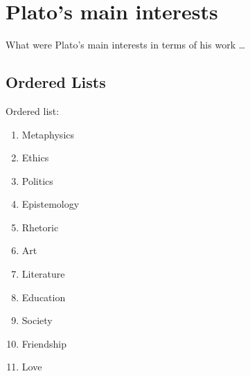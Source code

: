 \documentclass[11pt]{article}
\begin{document}
	\section{Plato's main interests} %
		What were Plato's main interests in terms of his work \ldots

		\subsection{Ordered Lists}

			Ordered list:

			\begin{enumerate}
    			\item Metaphysics
				\item Ethics
				\item Politics
				\item Epistemology
				\item Rhetoric
				\item Art
				\item Literature
				\item Education
				\item Society
				\item Friendship
				\item Love
			\end{enumerate}
\end{document}
